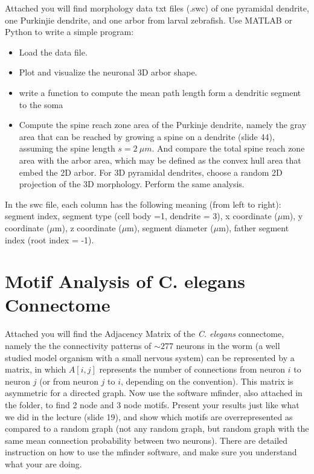 \documentclass{article}
\begin{document}
Attached you will find morphology data txt files (.swc) of one pyramidal dendrite, one Purkinjie dendrite, and one arbor from larval zebrafish. Use MATLAB or Python to write a simple program: 
\begin{itemize}
\item Load the data file. 
\item Plot and visualize the neuronal 3D arbor shape. 
\item write a function to compute the mean path length form a dendritic segment to the soma
\item Compute the spine reach zone area of the Purkinje dendrite, namely the gray area that can be reached by growing a spine on a dendrite (slide 44), assuming the spine length $s = 2 ~\mu m$. And compare the total spine reach zone area with the arbor area, which may be defined as the convex hull area that embed the 2D arbor. For 3D pyramidal dendrites, choose a random 2D projection of the 3D morphology. Perform the same analysis. 
\end{itemize}
In the swc file, each column has the following meaning (from left to right): segment index, segment type (cell body =1, dendrite = 3), x coordinate ($\mu$m), y coordinate ($\mu$m), z coordinate ($\mu$m), segment diameter ($\mu$m), father segment index (root index = -1). 


\section*{Motif Analysis of C. elegans Connectome}

Attached you will find the Adjacency Matrix of the \textit{C. elegans} connectome, namely the the connectivity patterns of $\sim 277$ neurons in the worm (a well studied model organism with a small nervous system) can be represented by a matrix, in which $A[i,j] $ represents the number of connections from neuron $i$ to neuron $j$ (or from neuron $j$ to $i$, depending on the convention).  This matrix is asymmetric for a directed graph. Now use the software mfinder, also attached in the folder, to find 2 node and 3 node motifs. Present your results just like what we did in the lecture (slide 19), and show which motifs are overrepresented as compared to a random graph (not any random graph, but random graph with the same mean connection probability between two neurons). There are detailed instruction on how to use the mfinder software, and make sure you understand what your are doing. 
\end{document}
